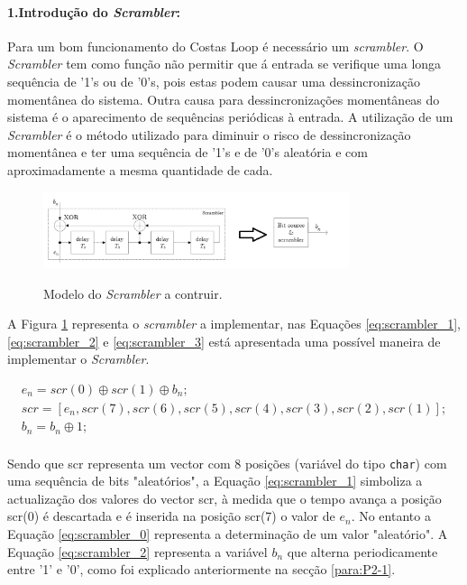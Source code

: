 \documentclass[11pt]{article}
\numberwithin{equation}{section}
\begin{document}
	\paragraph{1.Introdução do \textit{Scrambler}:} \hspace{0pt}
	\label{para:P3-1}
	
	Para um bom funcionamento do Costas Loop é necessário um \textit{scrambler}. O \textit{Scrambler} tem como função não permitir que á entrada se verifique uma longa sequência de '1's ou de '0's, pois estas podem causar uma dessincronização momentânea do sistema. Outra causa para dessincronizações momentâneas do sistema é o aparecimento de sequências periódicas à entrada. A utilização de um \textit{Scrambler} é o  método utilizado para diminuir o risco de dessincronização momentânea e ter uma sequência de '1's e de '0's aleatória e com aproximadamente a mesma quantidade de cada.
	\begin{figure}[H]
		\centering
		\includegraphics[width=0.8\textwidth]{./Scrambler}~\\
		\caption{Modelo do \textit{Scrambler} a contruir.}
		\label{fig:scrambler}
	\end{figure}
	
	A Figura \ref{fig:scrambler} representa o \textit{scrambler} a implementar, nas Equações \ref{eq:scrambler_1}, \ref{eq:scrambler_2} e \ref{eq:scrambler_3} está apresentada uma possível maneira de implementar o \textit{Scrambler}.
	
	\begin{gather}
	\label{eq:scrambler_0}
	e_n=scr(0) \oplus scr(1) \oplus b_n; \\
	\label{eq:scrambler_1}
	scr=[e_n, scr(7), scr(6), scr(5), scr(4), scr(3), scr(2), scr(1)];\\
	\label{eq:scrambler_2}
	b_n=b_n \oplus 1; \\
	\label{eq:scrambler_3}
	\end{gather}
	
	Sendo que scr representa um vector com 8 posições (variável do tipo \texttt{char}) com uma sequência de bits "aleatórios", a Equação \ref{eq:scrambler_1} simboliza a actualização dos valores do vector scr, à medida que o tempo avança a posição scr(0) é descartada e é inserida na posição scr(7) o valor de $ e_n $. No entanto a Equação \ref{eq:scrambler_0} representa a determinação de um valor "aleatório". A Equação \ref{eq:scrambler_2} representa a variável $ b_n $ que alterna periodicamente entre '1' e '0', como foi explicado anteriormente na secção \ref{para:P2-1}.
	
\end{document}

